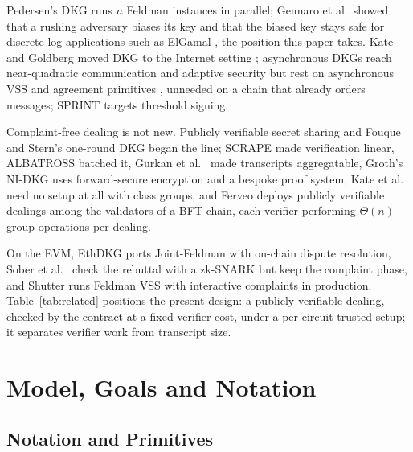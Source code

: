 Pedersen's DKG \cite{pedersen1991threshold} runs $n$ Feldman instances \cite{feldman1987practical} in parallel; Gennaro et al.\ showed that a rushing adversary biases its key \cite{gennaro1999secure} and that the biased key stays safe for discrete-log applications such as ElGamal \cite{gennaro2003applications}, the position this paper takes. Kate and Goldberg moved DKG to the Internet setting \cite{kate2009dkg}; asynchronous DKGs \cite{kokoris2020asynchronous,das2022practical,abraham2023bingo,das2023practical,zhang2023practical,abraham2025quadratic,feng2025coin} reach near-quadratic communication and adaptive security but rest on asynchronous VSS and agreement primitives \cite{bacho2025sok}, unneeded on a chain that already orders messages; SPRINT \cite{benhamouda2024sprint} targets threshold signing.

Complaint-free dealing is not new. Publicly verifiable secret sharing \cite{stadler1996pvss,schoenmakers1999pvss} and Fouque and Stern's one-round DKG \cite{fouque2001oneround} began the line; SCRAPE \cite{cascudo2017scrape} made verification linear, ALBATROSS \cite{cascudo2020albatross} batched it, Gurkan et al.\ \cite{gurkan2021aggregatable} made transcripts aggregatable, Groth's NI-DKG \cite{groth2021nidkg} uses forward-secure encryption and a bespoke proof system, Kate et al.\ \cite{kate2024classgroups} need no setup at all with class groups, and Ferveo \cite{bebel2022ferveo} deploys publicly verifiable dealings among the validators of a BFT chain, each verifier performing $\Theta(n)$ group operations per dealing.

On the EVM, EthDKG \cite{schindler2019ethdkg} ports Joint-Feldman with on-chain dispute resolution, Sober et al.\ \cite{sober2023zksnark} check the rebuttal with a zk-SNARK but keep the complaint phase, and Shutter \cite{shutter2024} runs Feldman VSS with interactive complaints in production. Table~\ref{tab:related} positions the present design: a publicly verifiable dealing, checked by the contract at a fixed verifier cost, under a per-circuit trusted setup; it separates verifier work from transcript size.

\section{Model, Goals and Notation}
\label{sec:model}

\subsection{Notation and Primitives}
\label{subsec:prelim}

